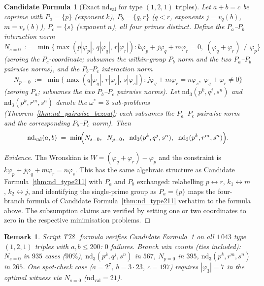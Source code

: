 \documentclass[12pt]{article}
\newtheorem{remark}{Remark}
\newtheorem{candidate}{Candidate Formula}
\theoremstyle{definition}
\begin{document}
\begin{candidate}[Exact $\mathrm{nd}_{\mathrm{val}}$ for type $(1,2,1)$ triples]\label{thm:nd_type121}
  Let $a + b = c$ be coprime with $P_a = \{p\}$ (exponent $k$),
  $P_b = \{q, r\}$ ($q < r$, exponents $j = v_q(b)$, $m = v_r(b)$),
  $P_c = \{s\}$ (exponent $n$), all four primes distinct.  Define the
  \emph{$P_a$--$P_b$ interaction norm}
  \[
    N_{s=0} \;:=\; \min\bigl\{\max(p|\varphi_p|,\,q|\varphi_q|,\,r|\varphi_r|) :
      k\varphi_p + j\varphi_q + m\varphi_r = 0,\;
      (\varphi_q+\varphi_r) \ne \varphi_p\bigr\}
  \]
  (zeroing the $P_c$-coordinate; subsumes the within-group $P_b$ norm and the two
  $P_a$--$P_b$ pairwise norms), and the \emph{$P_b$--$P_c$ interaction norm}
  \[
    N_{p=0} \;:=\; \min\bigl\{\max(q|\varphi_q|,\,r|\varphi_r|,\,s|\varphi_s|) :
      j\varphi_q + m\varphi_r = n\varphi_s,\;
      \varphi_q + \varphi_r \ne 0\bigr\}
  \]
  (zeroing $P_a$; subsumes the two $P_b$--$P_c$ pairwise norms).
  Let $\mathrm{nd}_{3}(p^k,q^j,s^n)$ and $\mathrm{nd}_{3}(p^k,r^m,s^n)$ denote the
  $\omega^*=3$ sub-problems (Theorem~\ref{thm:nd_pairwise_bezout}; each subsumes the
  $P_a$--$P_c$ pairwise norm and the corresponding $P_b$--$P_c$ norm).  Then
  \[
    \mathrm{nd}_{\mathrm{val}}(a,b) \;=\; \min\!\Bigl(
      N_{s=0},\;\; N_{p=0},\;\;
      \mathrm{nd}_{3}(p^k,q^j,s^n),\;\;
      \mathrm{nd}_{3}(p^k,r^m,s^n)
    \Bigr).
  \]
\end{candidate}

\begin{proof}[Evidence]
  The Wronskian is $W = (\varphi_q + \varphi_r) - \varphi_p$ and the constraint
  is $k\varphi_p + j\varphi_q + m\varphi_r = n\varphi_s$.  This has the same
  algebraic structure as Candidate Formula~\ref{thm:nd_type211} with $P_a$ and $P_b$
  exchanged: relabelling $p \leftrightarrow r$, $k_1 \leftrightarrow m$,
  $k_2 \leftrightarrow j$, and identifying the single-prime group as $P_a = \{p\}$
  maps the four-branch formula of Candidate Formula~\ref{thm:nd_type211} verbatim to the
  formula above.  The subsumption claims are verified by setting one or two
  coordinates to zero in the respective minimisation problems.
\end{proof}

\begin{remark}
  Script T78\_formula verifies Candidate Formula~\ref{thm:nd_type121} on all $1\,043$ type~$(1,2,1)$
  triples with $a, b \le 200$: $0$ failures.
  Branch win counts (ties included): $N_{s=0}$ in $935$ cases ($90\%$),
  $\mathrm{nd}_{3}(p^k,q^j,s^n)$ in $567$, $N_{p=0}$ in $395$,
  $\mathrm{nd}_{3}(p^k,r^m,s^n)$ in $265$.
  One spot-check case ($a = 2^7$, $b = 3 \cdot 23$, $c = 197$)
  requires $|\varphi_3| = 7$ in the optimal witness via $N_{s=0}$ ($\mathrm{nd}_{\mathrm{val}}=21$).
\end{remark}
\end{document}
